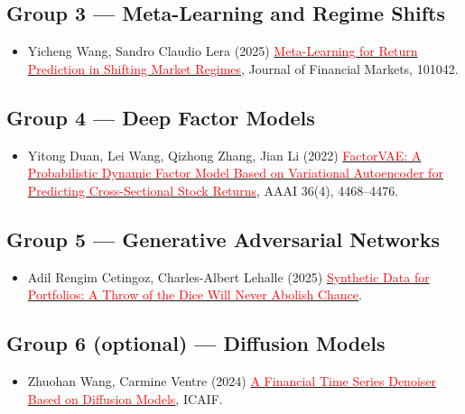 \documentclass[11pt]{article}
\newcommand{\paper}[2]{\href{#2}{\textcolor{red}{#1}}}
\begin{document}
\subsection*{Group 3 --- Meta-Learning and Regime Shifts}

\begin{itemize}
  \item Yicheng Wang, Sandro Claudio Lera (2025) \paper{Meta-Learning for
    Return Prediction in Shifting Market
    Regimes}{https://doi.org/10.1016/j.finmar.2025.101042}, Journal of
    Financial Markets, 101042.
\end{itemize}

\subsection*{Group 4 --- Deep Factor Models}

\begin{itemize}
  \item Yitong Duan, Lei Wang, Qizhong Zhang, Jian Li (2022)
    \paper{FactorVAE: A Probabilistic Dynamic Factor Model Based on Variational
    Autoencoder for Predicting Cross-Sectional Stock
    Returns}{https://doi.org/10.1609/aaai.v36i4.20369}, AAAI 36(4), 4468--4476.
\end{itemize}

\subsection*{Group 5 --- Generative Adversarial Networks}

\begin{itemize}
  \item Adil Rengim Cetingoz, Charles-Albert Lehalle (2025)
    \paper{Synthetic Data for Portfolios: A Throw of the Dice Will Never Abolish
    Chance}{https://arxiv.org/pdf/2501.03993}.
\end{itemize}

\subsection*{Group 6 (optional) --- Diffusion Models}

\begin{itemize}
  \item Zhuohan Wang, Carmine Ventre (2024) \paper{A
    Financial Time Series Denoiser Based on Diffusion
    Models}{https://doi.org/10.1145/3677052.3698649}, ICAIF.
\end{itemize}
\end{document}

